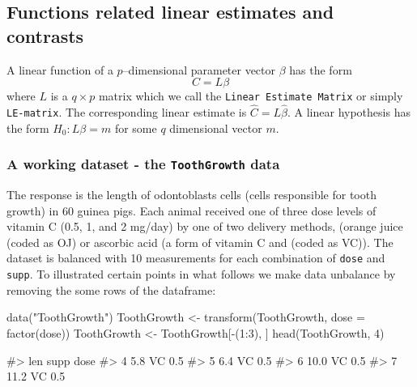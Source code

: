 \hypertarget{functions-related-linear-estimates-and-contrasts}{%
\subsection{Functions related linear estimates and
contrasts}\label{functions-related-linear-estimates-and-contrasts}}

A linear function of a \(p\)--dimensional parameter vector \(\beta\) has
the form \begin{displaymath}
  C=L\beta
\end{displaymath} where \(L\) is a \(q\times p\) matrix which we call
the \texttt{Linear\ Estimate\ Matrix} or simply \texttt{LE-matrix}. The
corresponding linear estimate is \(\hat C = L \hat \beta\). A linear
hypothesis has the form \(H_0: L\beta=m\) for some \(q\) dimensional
vector \(m\).

\hypertarget{a-working-dataset---the-toothgrowth-data}{%
\subsubsection{\texorpdfstring{A working dataset - the
\texttt{ToothGrowth}
data}{A working dataset - the ToothGrowth data}}\label{a-working-dataset---the-toothgrowth-data}}

The response is the length of odontoblasts cells (cells responsible for
tooth growth) in 60 guinea pigs. Each animal received one of three dose
levels of vitamin C (0.5, 1, and 2 mg/day) by one of two delivery
methods, (orange juice (coded as OJ) or ascorbic acid (a form of vitamin
C and (coded as VC)). The dataset is balanced with 10 measurements for
each combination of \texttt{dose} and \texttt{supp}. To illustrated
certain points in what follows we make data unbalance by removing the
some rows of the dataframe:

\begin{Schunk}
\begin{Sinput}
data("ToothGrowth")
ToothGrowth <- transform(ToothGrowth, dose = factor(dose))
ToothGrowth <- ToothGrowth[-(1:3), ]
head(ToothGrowth, 4)
\end{Sinput}
\begin{Soutput}
#>    len supp dose
#> 4  5.8   VC  0.5
#> 5  6.4   VC  0.5
#> 6 10.0   VC  0.5
#> 7 11.2   VC  0.5
\end{Soutput}
\end{Schunk}

